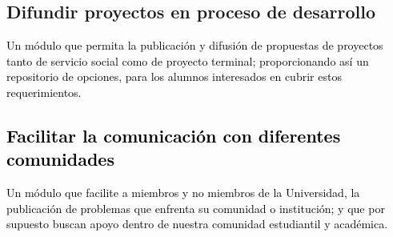 \documentclass[11pt,letterpaper,titlepage]{article}
\begin{document}

\subsection{Difundir proyectos en proceso de desarrollo}
\textcolor{black}{
Un m\'odulo que permita la publicaci\'on y difusi\'on de propuestas de proyectos tanto de servicio social como de proyecto terminal; proporcionando as\'i un repositorio de opciones, para los alumnos interesados en cubrir estos requerimientos.}


\textcolor{black}{
\subsection{Facilitar la comunicaci\'on con diferentes comunidades}
Un m\'odulo que facilite a miembros y no miembros de la Universidad, la publicaci\'on de problemas que enfrenta su comunidad o instituci\'on; y que por supuesto buscan apoyo dentro de nuestra comunidad estudiantil y acad\'emica. }
\end{document}
